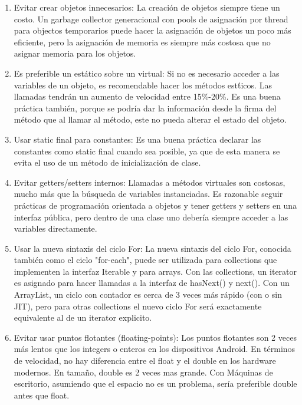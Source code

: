 \begin{enumerate}

\item Evitar crear objetos innecesarios: La creaci\'on de objetos siempre tiene un costo. Un garbage collector generacional con pools de asignaci\'on por thread para objectos temporarios puede hacer la asignaci\'on de objetos un poco m\'as eficiente, pero la asignaci\'on de memoria es siempre m\'as costosa que no asignar memoria para los objetos.

\item Es preferible un est\'atico sobre un virtual: Si no es necesario acceder a las variables de un objeto, es recomendable hacer los m\'etodos est\'ticos. Las llamadas tendr\'an un aumento de velocidad entre 15\%-20\%. Es una buena pr\'actica tambi\'en, porque se podr\'ia dar la informaci\'on desde la firma del m\'etodo que al llamar al m\'etodo, este no pueda alterar el estado del objeto.

\item Usar static final para constantes: Es una buena pr\'actica declarar las constantes como static final cuando sea posible, ya que de esta manera se evita el uso de un m\'etodo de inicializaci\'on de clase. 

\item Evitar getters/setters internos: Llamadas a m\'etodos virtuales son costosas, mucho m\'as que la b\'usqueda de variables instanciadas. Es razonable seguir pr\'acticas de programaci\'on orientada a objetos y tener getters y setters en una interfaz p\'ublica, pero dentro de una clase uno deber\'ia siempre acceder a las variables directamente.

\item Usar la nueva sintaxis del ciclo For: La nueva sintaxis del ciclo For, conocida tambi\'en como el ciclo "for-each", puede ser utilizada para collections que implementen la interfaz Iterable y para arrays. Con las collections, un iterator es asignado para hacer llamadas a la interfaz de hasNext() y next(). Con un ArrayList, un ciclo con contador es cerca de 3 veces m\'as r\'apido (con o sin \ac{JIT}), pero para otras collections el nuevo ciclo For ser\'a exactamente equivalente al de un iterator explicito.

\item Evitar usar puntos flotantes (floating-points): Los puntos flotantes son 2 veces m\'as lentos que los integers o enteros en los dispositivos Android. En t\'erminos de velocidad, no hay diferencia entre el float y el double en los hardware modernos. En tama\~no, double es 2 veces mas grande. Con M\'aquinas de escritorio, asumiendo que el espacio no es un problema, ser\'ia preferible double antes que float. 


\end{enumerate}
